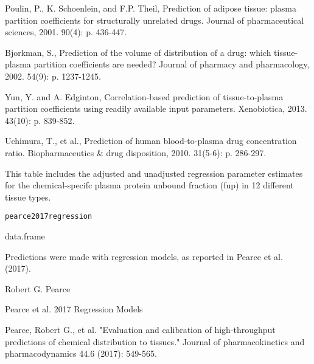 \documentclass[a4paper]{book}
\begin{document}
\begin{References}
Poulin, P., K. Schoenlein, and F.P. Theil, Prediction of adipose tissue:
plasma partition coefficients for structurally unrelated drugs. Journal of
pharmaceutical sciences, 2001. 90(4): p. 436-447.

Bjorkman, S., Prediction of the volume of distribution of a drug: which
tissue-plasma partition coefficients are needed? Journal of pharmacy and
pharmacology, 2002. 54(9): p. 1237-1245.

Yun, Y. and A. Edginton, Correlation-based prediction of tissue-to-plasma
partition coefficients using readily available input parameters.
Xenobiotica, 2013. 43(10): p. 839-852.

Uchimura, T., et al., Prediction of human blood-to-plasma drug concentration
ratio. Biopharmaceutics \& drug disposition, 2010. 31(5-6): p. 286-297.
\end{References}
%
\begin{Description}\relax
This table includes the adjusted and unadjusted regression parameter
estimates for the chemical-specifc plasma
protein unbound fraction (fup) in 12 different tissue types.
\end{Description}
%
\begin{Usage}
\begin{verbatim}
pearce2017regression
\end{verbatim}
\end{Usage}
%
\begin{Format}
data.frame
\end{Format}
%
\begin{Details}\relax
Predictions were made with regression models, 
as reported in Pearce et al. (2017).
\end{Details}
%
\begin{Author}\relax
Robert G. Pearce
\end{Author}
%
\begin{Source}\relax
Pearce et al. 2017 Regression Models
\end{Source}
%
\begin{References}\relax
Pearce, Robert G., et al. "Evaluation and calibration of 
high-throughput predictions of chemical distribution to tissues."
Journal of pharmacokinetics and pharmacodynamics 44.6 (2017): 549-565.
\end{References}
\end{document}
